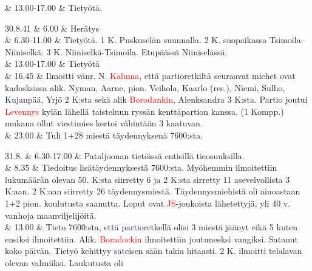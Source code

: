 \documentclass[11pt,a5paper,oneside]{book}
\begin{document}
& 13.00-17.00 & Tietyötä. \\

\taulustop


30.8.41 & 6.00 & Herätys \\

& 6.30-11.00 & Tietyötä. 1 K. Puskuselän suunnalla. 2 K. suopaikassa Tsimoila-Niiniselkä. 3 K. Niiniselkä-Tsimoila. \newline Etupäässä Niiniselässä. \newline \\

& 13.00-17.00 & Tietyötä \\

& 16.45 & Ilmoitti vänr. N. \textcolor{red}{Kaluma}, että partioretkiltä seuraavat miehet ovat kadosksissa alik. Nyman, Aarne, pion. Veihola, Kaarlo (res.), Niemi, Sulho, Kujanpää, Yrjö 2 K:sta sekä alik \textcolor{red}{Borodankin}, Alenksandra 3 K:sta. Partio joutui \textcolor{red}{Levennys} kylän lähellä taisteluun ryssän kenttäpartion kanssa. \newline (1 Kompp.) mukana ollut viestimies kertoi vähintään 3 kaatuvan. \newline \\

& 23.00 & Tuli 1+28 miestä täydennyksenä 7600:sta. \\
\newpage

31.8. & 6.30-17.00 & Pataljoonan tietöissä entisillä tieosuuksilla. \\

& 8.35 & Tiedoitus lisätäydennyksestä 7600:sta. Myöhemmin ilmoitettiin lukumäärän olevan 50.  K:sta siirretty 6 ja 2 K:sta sirretty 11 asevelvollista 3 K:aan. 2 K:aan siirretty 26 täydennysmiestä. Täydennysmiehistä oli ainoastaan 1+2 pion. koulutusta saanutta. Loput ovat \textcolor{red}{JS}-joukoista lähetettyjä, yli 40 v. vanhoja maanviljelijöitä. \\

& 13.00 & Tieto 7600:sta, että partioretkellä olisi 3 miestä jäänyt eikä 5 kuten ensiksi ilmoitettiin. Alik. \textcolor{red}{Boradockin} ilmoitettiin joutuneeksi vangiksi. \newline Satanut koko päivän. Tietyö kehittyy sateisen sään takia hitaasti. 2 K. ilmoitti telalavan olevan valmiiksi. Laukutusta oli \\ 
\taulustop
\end{document}

